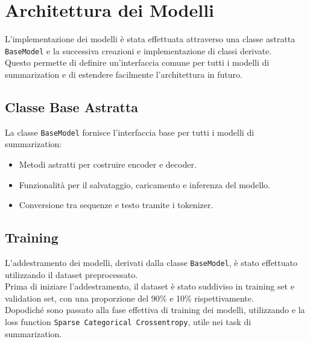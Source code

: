 

\section{Architettura dei Modelli}
L'implementazione dei modelli è stata effettuata attraverso una classe astratta \texttt{BaseModel} e la successiva creazioni e implementazione di classi derivate.\\
Questo permette di definire un'interfaccia comune per tutti i modelli di summarization e di estendere facilmente l'architettura in futuro.\\

\subsection{Classe Base Astratta}
La classe \texttt{BaseModel} fornisce l'interfaccia base per tutti i modelli di summarization:
\begin{itemize}
    \item Metodi astratti per costruire encoder e decoder.
    \item Funzionalità per il salvataggio, caricamento e inferenza del modello.
    \item Conversione tra sequenze e testo tramite i tokenizer.
\end{itemize}

\subsection{Training}
L'addestramento dei modelli, derivati dalla classe \texttt{BaseModel}, è stato effettuato utilizzando il dataset preprocessato.\\
Prima di iniziare l'addestramento, il dataset è stato suddiviso in training set e validation set, con una proporzione del 90\% e 10\% rispettivamente.\\
Dopodiché sono passato alla fase effettiva di training dei modelli, utilizzando e la loss function \texttt{Sparse Categorical Crossentropy}, utile nei task di summarization.\\

